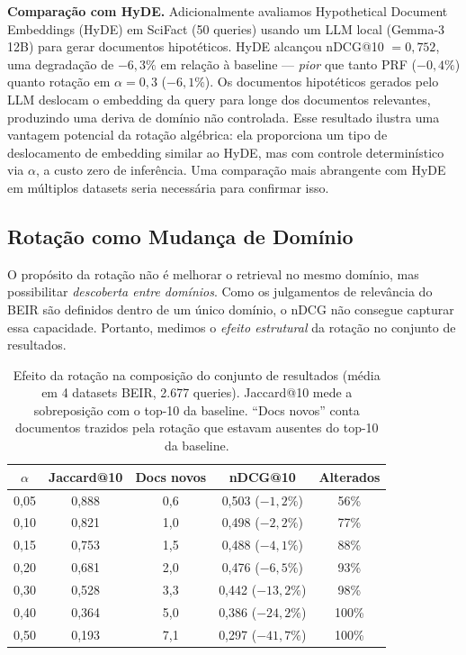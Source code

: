 \documentclass{article}
\begin{document}
\textbf{Comparação com HyDE.} Adicionalmente avaliamos Hypothetical Document Embeddings (HyDE) \cite{gao2023hyde} em SciFact (50 queries) usando um LLM local (Gemma-3 12B) para gerar documentos hipotéticos. HyDE alcançou nDCG@10 $= 0{,}752$, uma degradação de $-6{,}3\%$ em relação à baseline --- \emph{pior} que tanto PRF ($-0{,}4\%$) quanto rotação em $\alpha = 0{,}3$ ($-6{,}1\%$). Os documentos hipotéticos gerados pelo LLM deslocam o embedding da query para longe dos documentos relevantes, produzindo uma deriva de domínio não controlada. Esse resultado ilustra uma vantagem potencial da rotação algébrica: ela proporciona um tipo de deslocamento de embedding similar ao HyDE, mas com controle determinístico via $\alpha$, a custo zero de inferência. Uma comparação mais abrangente com HyDE em múltiplos datasets seria necessária para confirmar isso.

\subsection{Rotação como Mudança de Domínio}

O propósito da rotação não é melhorar o retrieval no mesmo domínio, mas possibilitar \emph{descoberta entre domínios}. Como os julgamentos de relevância do BEIR são definidos dentro de um único domínio, o nDCG não consegue capturar essa capacidade. Portanto, medimos o \emph{efeito estrutural} da rotação no conjunto de resultados.

\begin{table}[ht]
\centering
\caption{Efeito da rotação na composição do conjunto de resultados (média em 4 datasets BEIR, 2.677 queries). Jaccard@10 mede a sobreposição com o top-10 da baseline. ``Docs novos'' conta documentos trazidos pela rotação que estavam ausentes do top-10 da baseline.}
\label{tab:beir_rotation}
\begin{tabular}{ccccc}
\toprule
$\alpha$ & Jaccard@10 & Docs novos & nDCG@10 & Alterados \\
\midrule
0,05 & 0,888 & 0,6 & 0,503 ($-1{,}2\%$) & 56\% \\
0,10 & 0,821 & 1,0 & 0,498 ($-2{,}2\%$) & 77\% \\
0,15 & 0,753 & 1,5 & 0,488 ($-4{,}1\%$) & 88\% \\
0,20 & 0,681 & 2,0 & 0,476 ($-6{,}5\%$) & 93\% \\
0,30 & 0,528 & 3,3 & 0,442 ($-13{,}2\%$) & 98\% \\
0,40 & 0,364 & 5,0 & 0,386 ($-24{,}2\%$) & 100\% \\
0,50 & 0,193 & 7,1 & 0,297 ($-41{,}7\%$) & 100\% \\
\bottomrule
\end{tabular}
\end{table}
\end{document}

